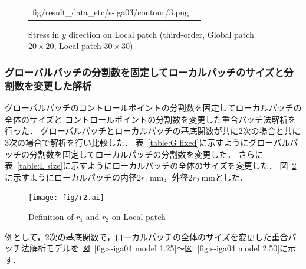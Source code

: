 \begin{figure}[hbtp]
\begin{tabular}{cc}
\begin{minipage}[t]{0.45\hsize}
      {fig/result_data_etc/s-iga03/contour/3.png}
      \caption{Stress in $y$ direction on Local patch (third-order, Global patch $20\times 20$, Local patch $30\times 30$)}
      \label{fig:s-iga03 y 3}
    \end{minipage}
  \end{tabular}
\end{figure}

\newpage

\subsubsection{グローバルパッチの分割数を固定してローカルパッチのサイズと分割数を変更した解析}
グローバルパッチのコントロールポイントの分割数を固定してローカルパッチの全体のサイズと
コントロールポイントの分割数を変更した重合パッチ法解析を行った．
グローバルパッチとローカルパッチの基底関数が共に2次の場合と共に3次の場合で解析を行い比較した．
表~\ref{table:G fixed}に示すようにグローバルパッチの分割数を固定してローカルパッチの分割数を変更した．
さらに表~\ref{table:L size}に示すようにローカルパッチの全体のサイズを変更した．
図~\ref{fig:r1 r2}に示すようにローカルパッチの内径$2r_1\ $mm，外径$2r_2\ $mmとした．

\begin{table}[hbtp]
  \caption{Local patch size of S-IGA analytical model}
  \label{table:L size}
  \centering
\end{table}

\begin{figure}[htbp]
  \centering
  \texttt{[image: fig/r2.ai]}
  \caption{Definition of $r_1$ and $r_2$ on Local patch}
  \label{fig:r1 r2}
\end{figure}

\newpage

例として，2次の基底関数で，ローカルパッチの全体のサイズを変更した重合パッチ法解析モデルを
図~\ref{fig:s-iga04 model 1.25}～図~\ref{fig:s-iga04 model 2.50}に示す．

